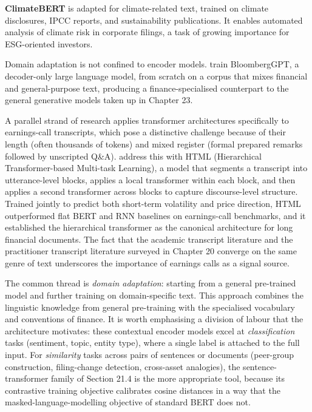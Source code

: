\textbf{ClimateBERT} \citep{webersinke2022climatebert} is adapted for climate-related text, trained on climate disclosures, IPCC reports, and sustainability publications. It enables automated analysis of climate risk in corporate filings, a task of growing importance for ESG-oriented investors.

Domain adaptation is not confined to encoder models. \cite{wu2023bloomberggpt} train BloombergGPT, a decoder-only large language model, from scratch on a corpus that mixes financial and general-purpose text, producing a finance-specialised counterpart to the general generative models taken up in Chapter 23.

A parallel strand of research applies transformer architectures specifically to earnings-call transcripts, which pose a distinctive challenge because of their length (often thousands of tokens) and mixed register (formal prepared remarks followed by unscripted Q\&A). \cite{yang2020html} address this with HTML (Hierarchical Transformer-based Multi-task Learning), a model that segments a transcript into utterance-level blocks, applies a local transformer within each block, and then applies a second transformer across blocks to capture discourse-level structure. Trained jointly to predict both short-term volatility and price direction, HTML outperformed flat BERT and RNN baselines on earnings-call benchmarks, and it established the hierarchical transformer as the canonical architecture for long financial documents. The fact that the academic transcript literature \citep{yang2020html} and the practitioner transcript literature surveyed in Chapter 20 converge on the same genre of text underscores the importance of earnings calls as a signal source.

The common thread is \textit{domain adaptation}: starting from a general pre-trained model and further training on domain-specific text. This approach combines the linguistic knowledge from general pre-training with the specialised vocabulary and conventions of finance. It is worth emphasising a division of labour that the architecture motivates: these contextual encoder models excel at \textit{classification} tasks (sentiment, topic, entity type), where a single label is attached to the full input. For \textit{similarity} tasks across pairs of sentences or documents (peer-group construction, filing-change detection, cross-asset analogies), the sentence-transformer family of Section 21.4 is the more appropriate tool, because its contrastive training objective calibrates cosine distances in a way that the masked-language-modelling objective of standard BERT does not.

